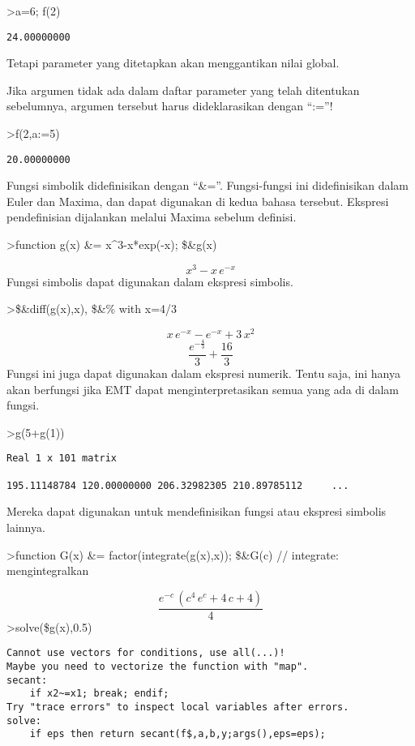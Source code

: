 \documentclass[
]{book}
\begin{document}
\textgreater a=6; f(2)

\begin{verbatim}
24.00000000 
\end{verbatim}

Tetapi parameter yang ditetapkan akan menggantikan nilai global.

Jika argumen tidak ada dalam daftar parameter yang telah ditentukan sebelumnya, argumen tersebut harus dideklarasikan dengan ``:=''!

\textgreater f(2,a:=5)

\begin{verbatim}
20.00000000 
\end{verbatim}

Fungsi simbolik didefinisikan dengan ``\&=''. Fungsi-fungsi ini didefinisikan dalam Euler dan Maxima, dan dapat digunakan di kedua bahasa tersebut. Ekspresi pendefinisian dijalankan melalui Maxima sebelum definisi.

\textgreater function g(x) \&= x\^{}3-x*exp(-x); \$\&g(x)

\[x^3-x\,e^ {- x }\]Fungsi simbolis dapat digunakan dalam ekspresi simbolis.

\textgreater\$\&diff(g(x),x), \$\&\% with x=4/3

\[x\,e^ {- x }-e^ {- x }+3\,x^2\]\[\frac{e^ {- \frac{4}{3} }}{3}+\frac{16}{3}\]Fungsi ini juga dapat digunakan dalam ekspresi numerik. Tentu saja, ini hanya akan berfungsi jika EMT dapat menginterpretasikan semua yang ada di dalam fungsi.

\textgreater g(5+g(1))

\begin{verbatim}
Real 1 x 101 matrix

195.11148784 120.00000000 206.32982305 210.89785112     ...
\end{verbatim}

Mereka dapat digunakan untuk mendefinisikan fungsi atau ekspresi simbolis lainnya.

\textgreater function G(x) \&= factor(integrate(g(x),x)); \$\&G(c) // integrate: mengintegralkan

\[\frac{e^ {- c }\,\left(c^4\,e^{c}+4\,c+4\right)}{4}\]\textgreater solve(\$g(x),0.5)

\begin{verbatim}
Cannot use vectors for conditions, use all(...)!
Maybe you need to vectorize the function with "map".
secant:
    if x2~=x1; break; endif;
Try "trace errors" to inspect local variables after errors.
solve:
    if eps then return secant(f$,a,b,y;args(),eps=eps);
\end{verbatim}
\end{document}
